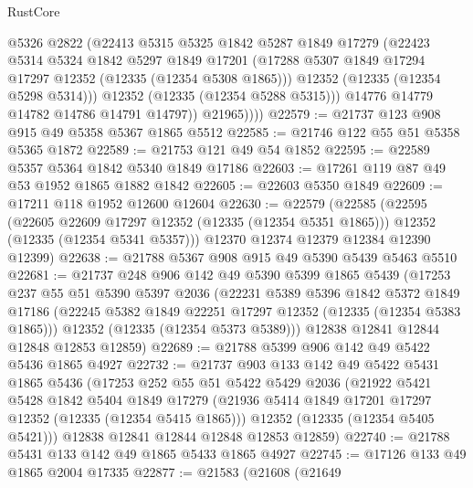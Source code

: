 \begin{lexlean}{RustCore}
\begin{coremodule}
                @5326
                @2822
                (@22413
                  @5315
                  @5325
                  @1842
                  @5287
                  @1849
                  @17279
                  (@22423
                    @5314
                    @5324
                    @1842
                    @5297
                    @1849
                    @17201
                    (@17288 @5307 @1849 @17294 @17297 @12352 (@12335 (@12354 @5308 @1865)))
                    @12352
                    (@12335 (@12354 @5298 @5314)))
                  @12352
                  (@12335 (@12354 @5288 @5315)))
                @14776
                @14779
                @14782
                @14786
                @14791
                @14797))
            @21965))))
@22579 := @21737 @123 @908 @915 @49 @5358 @5367 @1865 @5512
@22585 := @21746 @122 @55 @51 @5358 @5365 @1872
@22589 := @21753 @121 @49 @54 @1852
@22595 := @22589 @5357 @5364 @1842 @5340 @1849 @17186
@22603 := @17261 @119 @87 @49 @53 @1952 @1865 @1882 @1842
@22605 := @22603 @5350 @1849
@22609 := @17211 @118 @1952 @12600 @12604
@22630 := @22579
    (@22585
      (@22595
        (@22605 @22609 @17297 @12352 (@12335 (@12354 @5351 @1865)))
        @12352
        (@12335 (@12354 @5341 @5357)))
      @12370
      @12374
      @12379
      @12384
      @12390
      @12399)
@22638 := @21788 @5367 @908 @915 @49 @5390 @5439 @5463 @5510
@22681 := @21737
    @248
    @906
    @142
    @49
    @5390
    @5399
    @1865
    @5439
    (@17253
      @237
      @55
      @51
      @5390
      @5397
      @2036
      (@22231
        @5389
        @5396
        @1842
        @5372
        @1849
        @17186
        (@22245 @5382 @1849 @22251 @17297 @12352 (@12335 (@12354 @5383 @1865)))
        @12352
        (@12335 (@12354 @5373 @5389)))
      @12838
      @12841
      @12844
      @12848
      @12853
      @12859)
@22689 := @21788 @5399 @906 @142 @49 @5422 @5436 @1865 @4927
@22732 := @21737
    @903
    @133
    @142
    @49
    @5422
    @5431
    @1865
    @5436
    (@17253
      @252
      @55
      @51
      @5422
      @5429
      @2036
      (@21922
        @5421
        @5428
        @1842
        @5404
        @1849
        @17279
        (@21936 @5414 @1849 @17201 @17297 @12352 (@12335 (@12354 @5415 @1865)))
        @12352
        (@12335 (@12354 @5405 @5421)))
      @12838
      @12841
      @12844
      @12848
      @12853
      @12859)
@22740 := @21788 @5431 @133 @142 @49 @1865 @5433 @1865 @4927
@22745 := @17126 @133 @49 @1865 @2004 @17335
@22877 := @21583
    (@21608
      (@21649

\end{coremodule}
\end{lexlean}
